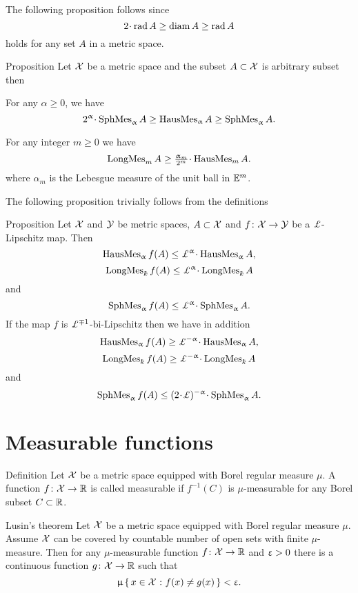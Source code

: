 The following proposition follows since
\[2\cdot\rad A
\ge
\diam A
\ge
\rad A\]
holds for any set $A$ in a metric space.

\begin{thm}{Proposition}
Let $\mathcal{X}$ be a metric space and the subset $A\subset \spc{X}$ is arbitrary subset
then
\begin{subthm}{}
For any $\alpha\ge 0$, we have
\[2^\alpha\cdot\SphMes_\alpha A\ge\HausMes_\alpha A\ge \SphMes_\alpha A.\]
\end{subthm}

\begin{subthm}{}
For any integer $m\ge 0$ we
have 
\[\LongMes_m A\ge \tfrac{\alpha_m}{2^m}\cdot\HausMes_m A.\]
where $\alpha_m$ is the Lebesgue measure of the unit ball in $\mathbb{E}^m$.
\end{subthm}
\end{thm}

The following proposition trivially follows from the definitions

\begin{thm}{Proposition}\label{prop:bilip-measure}
Let $\mathcal{X}$ and $\mathcal{Y}$ be metric spaces, $A\subset \spc{X}$
and
 $f\: \spc{X}\to \spc{Y}$ be a $\Lip$-Lipschitz map. 
Then 
\[\HausMes_\alpha f(A)\le \Lip^\alpha\cdot\HausMes_\alpha A,\]
\[\LongMes_\kay f(A)\le \Lip^\alpha \cdot\LongMes_\kay A\] 
and 
\[\SphMes_\alpha f(A)\le \Lip^\alpha\cdot \SphMes_\alpha A.\]
If the map $f$ is $\Lip^{\mp1}$-bi-Lipschitz
then we have in addition
\[\HausMes_\alpha f(A)\ge \Lip^{-\alpha}\cdot\HausMes_\alpha A,\]
\[\LongMes_\kay f(A)\ge \Lip^{-\alpha} \cdot\LongMes_\kay A\] 
and 
\[\SphMes_\alpha f(A)\le (2\cdot \Lip)^{-\alpha}\cdot \SphMes_\alpha A.\]
\end{thm}




\section{Measurable functions}

\begin{thm}{Definition}\label{def:meas-funct}
Let $\mathcal{X}$ be a metric space equipped with Borel regular measure $\mu$.
A function $f\:\spc{X}\to\RR$ is called measurable if $f^{-1}(C)$ is $\mu$-measurable for any Borel subset $C\subset \RR$.
\end{thm}


\begin{thm}{Lusin's theorem}\label{thm:lusin}
Let $\mathcal{X}$ be a metric space equipped with Borel regular measure $\mu$.
Assume $\mathcal{X}$ can be covered by countable number of open sets with finite $\mu$-measure.
Then for any $\mu$-measurable function $f\:\spc{X}\to\RR$ and $\upvarepsilon>0$
there is a continuous function $g\:\spc{X}\to\RR$ 
such that 
\[\mu\set{x\in \spc{X}}{f(x)\ne g(x)}<\eps.\]

\end{thm}


